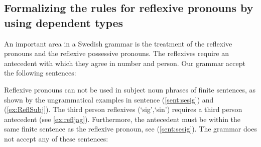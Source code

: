 \documentclass[10pt, a4paper]{article}
\begin{document}
\subsection{Formalizing the rules for reflexive pronouns by using dependent types}
\label{sec:reflexives}
An important area in a Swedish grammar is the treatment of the reflexive pronouns and
the reflexive possessive pronouns.
The reflexives require an antecedent with which they agree in
number and person.
Our grammar accept the following sentences:

\label{ex:ReflPredet}
\label{ex:ReflConj} \label{ex:ReflConj2}
Reflexive pronouns can not be used in subject noun phrases of finite sentences,
as shown by the ungrammatical examples in 
sentence (\ref{sent:sesig}) and (\ref{ex:ReflSubj}).
The third person reflexives (`sig',`sin') requires a third person antecedent (see \ref{ex:refljag}).
Furthermore, the antecedent must be within the same finite sentence as the reflexive
pronoun, see (\ref{sent:sesig}).
The grammar does not accept any of these sentences:
\label{ex:ReflSubj}
\label{ex:refljag}
\label{sent:sesig}
\end{document}
